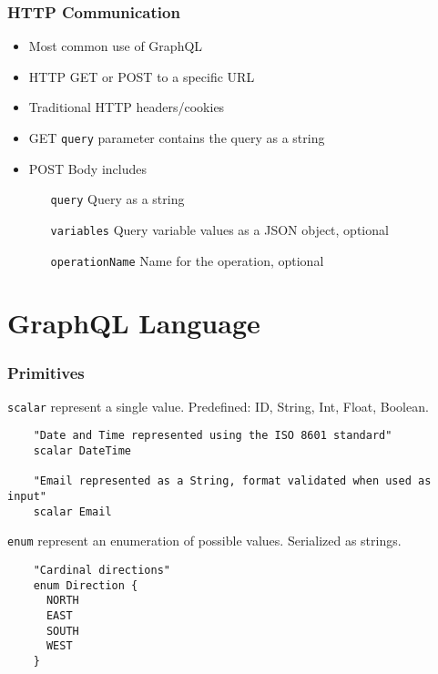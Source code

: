 \documentclass[notes]{beamer}
\begin{document}
\begin{frame}
  \frametitle{HTTP Communication}
  \begin{itemize}
  \item Most common use of GraphQL
  \item HTTP GET or POST to a specific URL
  \item Traditional HTTP headers/cookies
  \item GET \texttt{query} parameter contains the query as a string
  \item POST Body includes
    \begin{itemize}
    \item[\texttt{query}] Query as a string
    \item[\texttt{variables}] Query variable values as a JSON object,
      optional
    \item[\texttt{operationName}] Name for the operation, optional
    \end{itemize}
  \end{itemize}
\end{frame}


\section{GraphQL Language}
\begin{frame}[fragile]
  \frametitle{Primitives} \texttt{scalar} represent a single
  value. Predefined: ID, String, Int, Float, Boolean.
  \begin{verbatim}
    "Date and Time represented using the ISO 8601 standard"
    scalar DateTime

    "Email represented as a String, format validated when used as input"
    scalar Email
\end{verbatim}

  \texttt{enum} represent an enumeration of possible
  values. Serialized as strings.
  \begin{verbatim}
    "Cardinal directions"
    enum Direction {
      NORTH
      EAST
      SOUTH
      WEST
    }
\end{verbatim}
\end{frame}
\end{document}
